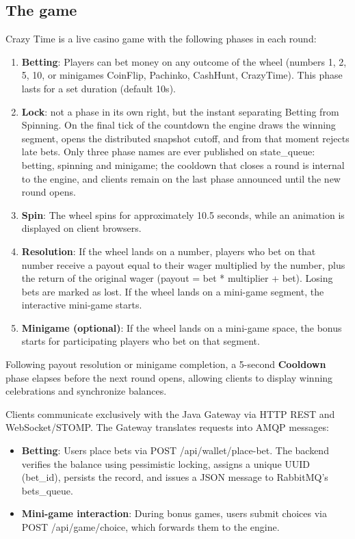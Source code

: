\documentclass[12pt,a4paper]{article}
\begin{document}
\subsection{The game}
Crazy Time is a live casino game with the following phases in each round:
\begin{enumerate}
    \item \textbf{Betting}: Players can bet money on any outcome of the wheel (numbers 1, 2, 5, 10, or minigames CoinFlip, Pachinko, CashHunt, CrazyTime). This phase lasts for a set duration (default 10s).
    \item \textbf{Lock}: not a phase in its own right, but the instant separating Betting from Spinning. On the final tick of the countdown the engine draws the winning segment, opens the distributed snapshot cutoff, and from that moment rejects late bets. Only three phase names are ever published on state\_\allowbreak queue: betting, spinning and minigame; the cooldown that closes a round is internal to the engine, and clients remain on the last phase announced until the new round opens.
    \item \textbf{Spin}: The wheel spins for approximately 10.5 seconds, while an animation is displayed on client browsers.
    \item \textbf{Resolution}: If the wheel lands on a number, players who bet on that number receive a payout equal to their wager multiplied by the number, plus the return of the original wager (payout = bet * multiplier + bet). Losing bets are marked as lost. If the wheel lands on a mini-game segment, the interactive mini-game starts.
    \item \textbf{Minigame (optional)}: If the wheel lands on a mini-game space, the bonus starts for participating players who bet on that segment.
\end{enumerate}

Following payout resolution or minigame completion, a 5-second \textbf{Cooldown} phase elapses before the next round opens, allowing clients to display winning celebrations and synchronize balances.

Clients communicate exclusively with the Java Gateway via HTTP REST and WebSocket/STOMP. The Gateway translates requests into AMQP messages:
\begin{itemize}
    \item \textbf{Betting}: Users place bets via POST /api/wallet/place-bet. The backend verifies the balance using pessimistic locking, assigns a unique UUID (bet\_\allowbreak id), persists the record, and issues a JSON message to RabbitMQ's bets\_\allowbreak queue.
    \item \textbf{Mini-game interaction}: During bonus games, users submit choices via POST /api/game/choice, which forwards them to the engine.
\end{itemize}
\end{document}
